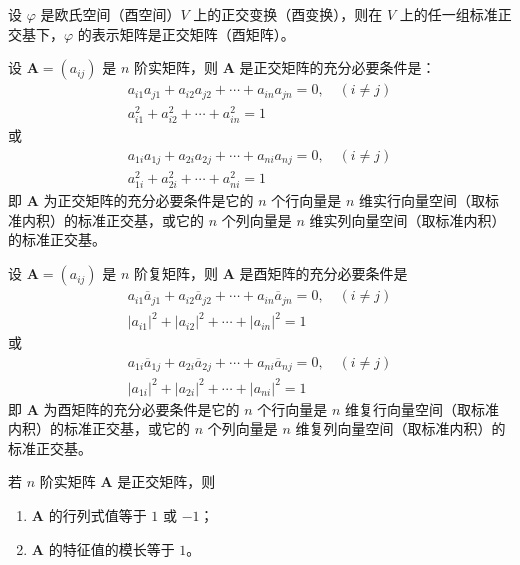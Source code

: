 \begin{theorem}
    设 $\varphi$ 是欧氏空间（酉空间）$V$ 上的正交变换（酉变换），则在 $V$ 上的任一组标准正交基下，$\varphi$ 的表示矩阵是正交矩阵（酉矩阵）。
\end{theorem}

\begin{theorem}
    设 $\bm{A} = (a_{ij})$ 是 $n$ 阶实矩阵，则 $\bm{A}$ 是正交矩阵的充分必要条件是：
    \begin{gather*}
        a_{i1}a_{j1} + a_{i2}a_{j2} + \cdots + a_{in}a_{jn} = 0, \quad (i \neq j) \\
        a_{i1}^{2} + a_{i2}^{2} + \cdots + a_{in}^{2} = 1
    \end{gather*}
    或
    \begin{gather*}
        a_{1i}a_{1j} + a_{2i}a_{2j} + \cdots + a_{ni}a_{nj} = 0, \quad (i \neq j) \\
        a_{1i}^{2} + a_{2i}^{2} + \cdots + a_{ni}^{2} = 1
    \end{gather*}
    即 $\bm{A}$ 为正交矩阵的充分必要条件是它的 $n$ 个行向量是 $n$ 维实行向量空间（取标准内积）的标准正交基，或它的 $n$ 个列向量是 $n$ 维实列向量空间（取标准内积）的标准正交基。
\end{theorem}

\begin{theorem}
    设 $\bm{A} = (a_{ij})$ 是 $n$ 阶复矩阵，则 $\bm{A}$ 是酉矩阵的充分必要条件是
    \begin{gather*}
        a_{i1}\overline{a}_{j1} + a_{i2}\overline{a}_{j2} + \cdots + a_{in}\overline{a}_{jn} = 0, \quad (i \neq j) \\
        {\vert a_{i1} \vert}^{2} + {\vert a_{i2} \vert}^{2} + \cdots + {\vert a_{in} \vert}^{2} = 1
    \end{gather*}
    或
    \begin{gather*}
        a_{1i}\overline{a}_{1j} + a_{2i}\overline{a}_{2j} + \cdots + a_{ni}\overline{a}_{nj} = 0, \quad (i \neq j) \\
        {\vert a_{1i} \vert}^{2} + {\vert a_{2i} \vert}^{2} + \cdots + {\vert a_{ni} \vert}^{2} = 1
    \end{gather*}
    即 $\bm{A}$ 为酉矩阵的充分必要条件是它的 $n$ 个行向量是 $n$ 维复行向量空间（取标准内积）的标准正交基，或它的 $n$ 个列向量是 $n$ 维复列向量空间（取标准内积）的标准正交基。
\end{theorem}

\begin{theorem}
    若 $n$ 阶实矩阵 $\bm{A}$ 是正交矩阵，则
    \begin{enumerate}
        \item $\bm{A}$ 的行列式值等于 $1$ 或 $-1$；
        \item $\bm{A}$ 的特征值的模长等于 $1$。
    \end{enumerate}
\end{theorem}

